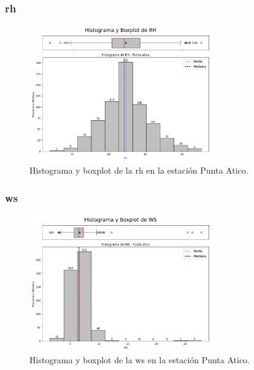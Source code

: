 \subsubsection*{\gls{rh} }
\begin{figure}[htbp]
\centering
\includegraphics[width=0.7\textwidth]{resultados/por_estacion_meteorologica/Punta_Atico/RH_histograma.png}
\caption{Histograma y boxplot de la \gls{rh}  en la estación Punta Atico.}
\label{fig:punta_atico_RH}
\end{figure}

\subsubsection*{\gls{ws} }
\begin{figure}[htbp]
\centering
\includegraphics[width=0.7\textwidth]{resultados/por_estacion_meteorologica/Punta_Atico/WS_histograma.png}
\caption{Histograma y boxplot de la \gls{ws}  en la estación Punta Atico.}
\label{fig:punta_atico_WS}
\end{figure}

